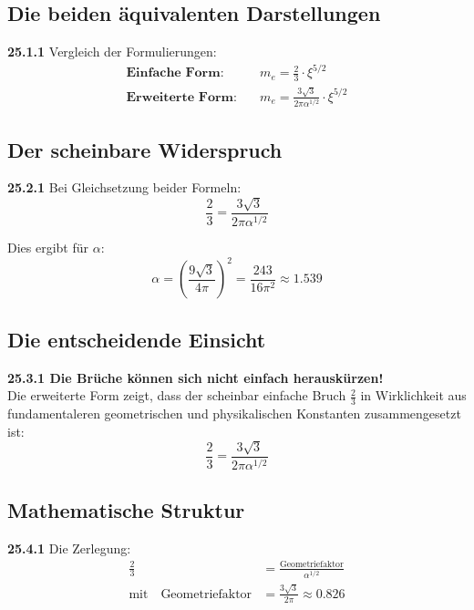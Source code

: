 \documentclass[12pt,a4paper]{article}
\begin{document}
\subsection{Die beiden äquivalenten Darstellungen}

\noindent \textbf{25.1.1} Vergleich der Formulierungen:
\begin{align*}
	\textbf{Einfache Form:} &\quad m_e = \frac{2}{3} \cdot \xi^{5/2} \\
	\textbf{Erweiterte Form:} &\quad m_e = \frac{3\sqrt{3}}{2\pi\alpha^{1/2}} \cdot \xi^{5/2}
\end{align*}

\subsection{Der scheinbare Widerspruch}

\noindent \textbf{25.2.1} Bei Gleichsetzung beider Formeln:
\[
\frac{2}{3} = \frac{3\sqrt{3}}{2\pi\alpha^{1/2}}
\]

Dies ergibt für $\alpha$:
\[
\alpha = \left(\frac{9\sqrt{3}}{4\pi}\right)^2 = \frac{243}{16\pi^2} \approx 1.539
\]

\subsection{Die entscheidende Einsicht}

\begin{tcolorbox}[colback=red!5!white,colframe=red!75!black]
	\textbf{25.3.1 Die Brüche können sich nicht einfach herauskürzen!}
	\\
	Die erweiterte Form zeigt, dass der scheinbar einfache Bruch $\frac{2}{3}$ in Wirklichkeit aus fundamentaleren geometrischen und physikalischen Konstanten zusammengesetzt ist:
	\[
	\frac{2}{3} = \frac{3\sqrt{3}}{2\pi\alpha^{1/2}}
	\]
\end{tcolorbox}

\subsection{Mathematische Struktur}

\noindent \textbf{25.4.1} Die Zerlegung:
\begin{align*}
	\frac{2}{3} &= \frac{\text{Geometriefaktor}}{\alpha^{1/2}} \\
	\text{mit} \quad \text{Geometriefaktor} &= \frac{3\sqrt{3}}{2\pi} \approx 0.826
\end{align*}
\end{document}
